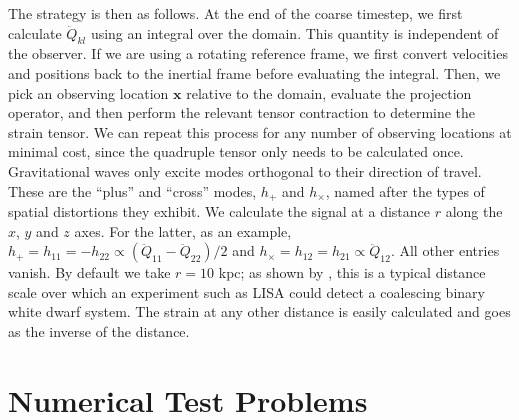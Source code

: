 \documentclass[iop]{../emulateapj}
\begin{document}
The strategy is then as follows. At the end of the coarse timestep, we first calculate $\ddot{Q}_{kl}$
using an integral over the domain. This quantity is independent of the observer. If we 
are using a rotating reference frame, we first convert velocities and positions back to the inertial 
frame before evaluating the integral. Then, 
we pick an observing location $\mathbf{x}$ relative to the domain, evaluate the projection operator, 
and then perform the relevant tensor contraction to determine the strain tensor. We can 
repeat this process for any number of observing locations at minimal cost, since the quadruple tensor 
only needs to be calculated once. Gravitational waves only excite modes orthogonal to their 
direction of travel. These are the ``plus'' and ``cross'' modes, $h_+$ and $h_\times$, named after 
the types of spatial distortions they exhibit. We calculate the signal at a distance $r$ along 
the $x$, $y$ and $z$ axes. For the latter, as an example, $h_{+} = h_{11} = -h_{22} \propto (\ddot{Q}_{11} - \ddot{Q}_{22})/2$ and 
$h_{\times} = h_{12} = h_{21} \propto \ddot{Q}_{12}$. All other entries vanish. By default we take $r = 10$ kpc; 
as shown by \citet{loren-aguilar:2005}, this is a typical distance scale over which an 
experiment such as LISA could detect a coalescing binary white dwarf system. 
The strain at any other distance is easily calculated and goes as the inverse of the distance.



\section{Numerical Test Problems}\label{sec:Tests}
\end{document}
